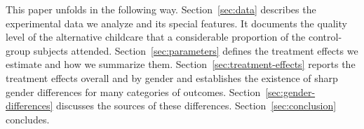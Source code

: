 This paper unfolds in the following way. Section~\ref{sec:data} describes the experimental data we analyze and its special features. It documents the quality level of the alternative childcare that a considerable proportion of the control-group subjects attended. Section~\ref{sec:parameters} defines the treatment effects we estimate and how we summarize them. Section~\ref{sec:treatment-effects} reports the treatment effects overall and by gender and establishes the existence of sharp gender differences for many categories of outcomes. Section~\ref{sec:gender-differences} discusses the sources of these differences. Section~\ref{sec:conclusion} concludes.


